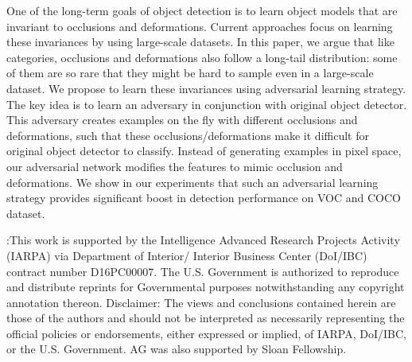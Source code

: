 \documentclass[10pt,twocolumn,letterpaper]{article}
\begin{document}
One of the long-term goals of object detection is to learn object models that are invariant to occlusions and deformations. Current approaches focus on learning these invariances by using large-scale datasets. In this paper, we argue that like categories, occlusions and deformations also follow a long-tail distribution: some of them are so rare that they might be hard to sample even in a large-scale dataset. We propose to learn these invariances using adversarial learning strategy. The key idea is to learn an adversary in conjunction with original object detector. This adversary creates examples on the fly with different occlusions and deformations, such that these occlusions/deformations make it difficult for original object detector to classify. Instead of generating examples in pixel space, our adversarial network modifies the features to mimic occlusion and deformations. We show in our experiments that such an adversarial learning strategy provides significant boost in detection performance on VOC and COCO dataset.


{\footnotesize
{}:This work is supported by the Intelligence Advanced Research Projects Activity (IARPA) via Department of Interior/ Interior Business Center (DoI/IBC) contract number D16PC00007. The U.S. Government is authorized to reproduce and distribute reprints for Governmental purposes notwithstanding any copyright annotation thereon. Disclaimer: The views and conclusions contained herein are those of the authors and should not be interpreted as necessarily representing the official policies or endorsements, either expressed or implied, of IARPA, DoI/IBC, or the U.S. Government. AG was also supported by Sloan Fellowship.}



{\small


}
\end{document}

